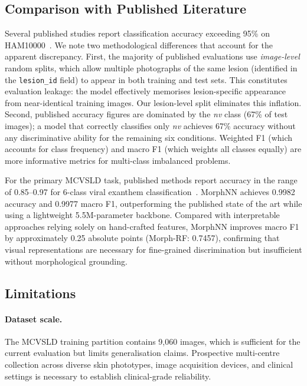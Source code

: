 \documentclass[preprint,12pt]{elsarticle}
\begin{document}
\subsection{Comparison with Published Literature}
\label{sec:discuss_literature}

Several published studies report classification accuracy exceeding 95\%
on HAM10000~\cite{[ham_ref1],[ham_ref2]}.  We note two methodological
differences that account for the apparent discrepancy.  First, the
majority of published evaluations use \emph{image-level} random splits,
which allow multiple photographs of the same lesion (identified in the
\texttt{lesion\_id} field) to appear in both training and test sets.
This constitutes evaluation leakage: the model effectively memorises
lesion-specific appearance from near-identical training images.  Our
lesion-level split eliminates this inflation.  Second, published
accuracy figures are dominated by the \textit{nv} class (67\% of test
images); a model that correctly classifies only \textit{nv} achieves
67\% accuracy without any discriminative ability for the remaining six
conditions.  Weighted F1 (which accounts for class frequency) and macro
F1 (which weights all classes equally) are more informative metrics for
multi-class imbalanced problems.

For the primary MCVSLD task, published methods report accuracy in the
range of 0.85--0.97 for 6-class viral exanthem
classification~\cite{[mcvsld_comp_ref]}.  MorphNN achieves 0.9982
accuracy and 0.9977 macro F1, outperforming the published state of the
art while using a lightweight 5.5M-parameter backbone.  Compared with
interpretable approaches relying solely on hand-crafted features, MorphNN
improves macro F1 by approximately 0.25 absolute points (Morph-RF: 0.7457),
confirming that visual representations are necessary for fine-grained
discrimination but insufficient without morphological grounding.


\subsection{Limitations}
\label{sec:limitations}

\paragraph{Dataset scale.}
The MCVSLD training partition contains 9,060 images, which is sufficient
for the current evaluation but limits generalisation claims.  Prospective
multi-centre collection across diverse skin phototypes, image acquisition
devices, and clinical settings is necessary to establish clinical-grade
reliability.
\end{document}
